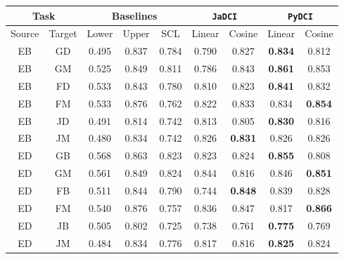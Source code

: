 \documentclass{article}
\newcommand{\jadci}{\texttt{JaDCI}}
\newcommand{\pydci}{\texttt{PyDCI}}
\begin{document}
\begin{table*}[ht!]
  \centering
\begin{tabular}{|c|c||c|c|c||c|c||c|c|}
    \hline
    \multicolumn{2}{|c||}{Task} & \multicolumn{3}{c||}{Baselines} & \multicolumn{2}{c||}{\jadci} & \multicolumn{2}{c|}{\pydci}       \\ \hline
    Source     & Target      & Lower         & Upper         & SCL & Linear   & Cosine          & Linear         & Cosine         \\\hline\hline
    EB         & GD          & 0.495         & 0.837         & 0.784 & 0.790    & 0.827           & \textbf{0.834} & 0.812          \\
    EB         & GM          & 0.525         & 0.849         & 0.811 & 0.786    & 0.843           & \textbf{0.861} & 0.853          \\
    EB         & FD          & 0.533         & 0.843         & 0.780 & 0.810    & 0.823           & \textbf{0.841} & 0.832          \\
    EB         & FM          & 0.533         & 0.876         & 0.762 & 0.822    & 0.833           & 0.834          & \textbf{0.854} \\
    EB         & JD          & 0.491         & 0.814         & 0.742 & 0.813    & 0.805           & \textbf{0.830} & 0.816          \\
    EB         & JM          & 0.480         & 0.834         & 0.742 & 0.826    & \textbf{0.831}  & 0.826          & 0.826          \\ \hline
    ED         & GB          & 0.568         & 0.863         & 0.823 & 0.823    & 0.824           & \textbf{0.855} & 0.808          \\
    ED         & GM          & 0.561         & 0.849         & 0.824 & 0.844    & 0.816           & 0.846          & \textbf{0.851} \\
    ED         & FB          & 0.511         & 0.844         & 0.790 & 0.744    & \textbf{0.848}  & 0.839          & 0.828          \\
    ED         & FM          & 0.540         & 0.876         & 0.757 & 0.836    & 0.847           & 0.817          & \textbf{0.866} \\
    ED         & JB          & 0.505         & 0.802         & 0.725 & 0.738    & 0.761           & \textbf{0.775} & 0.769          \\
    ED         & JM          & 0.484         & 0.834         & 0.776 & 0.817    & 0.816           & \textbf{0.825} & 0.824          \\ \hline

\end{tabular}
\end{table*}
\end{document}
